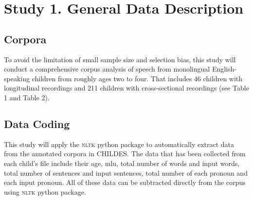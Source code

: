 \section{Study 1. General Data Description}
\subsection{Corpora}
To avoid the limitation of small sample size and selection bias, this study will conduct a comprehensive corpus analysis of speech from monolingual English-speaking children from roughly ages two to four. That includes 46 children with longitudinal recordings and 211 children with cross-sectional recordings (see Table 1 and Table 2).
\subsection{Data Coding}
This study will apply the \textsc{nltk} python package to automatically extract data from the annotated corpora in CHILDES. The data that has been collected from each child's file include their age, mlu, total number of words and input words, total number of sentences and input sentences, total number of each pronoun and each input pronoun. All of these data can be subtracted directly from the corpus using \textsc{nltk} python package.
